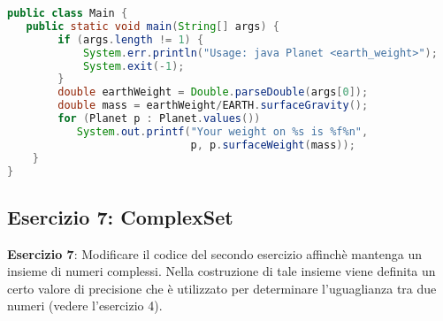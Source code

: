 \documentclass{article}
\begin{document}
\begin{lstlisting}[language=Java,escapechar=|]
public class Main {
   public static void main(String[] args) {
        if (args.length != 1) {
            System.err.println("Usage: java Planet <earth_weight>");
            System.exit(-1);
        }
        double earthWeight = Double.parseDouble(args[0]);
        double mass = earthWeight/EARTH.surfaceGravity();
        for (Planet p : Planet.values())
           System.out.printf("Your weight on %s is %f%n",
                             p, p.surfaceWeight(mass));
    }
}
\end{lstlisting}


\subsection{Esercizio 7: ComplexSet}
\begin{framed}
\textbf{Esercizio 7}:  Modificare il codice del secondo esercizio affinch\`e mantenga un insieme
di numeri complessi. Nella costruzione di tale insieme viene definita un certo valore di precisione
che è utilizzato per determinare l'uguaglianza tra due numeri (vedere l'esercizio 4).
\end{framed}
\end{document}

